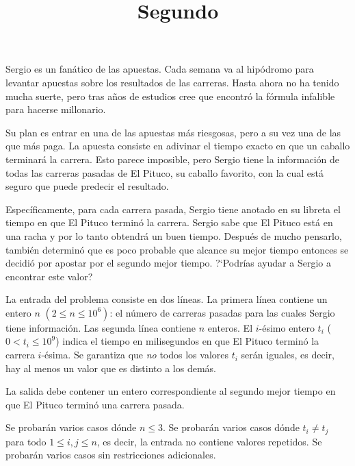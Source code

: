 \documentclass{oci}
\title{Segundo}
\newcommand{\caballo}{El Pituco\xspace}
\begin{document}
\begin{problemDescription}
Sergio es un fanático de las apuestas.
Cada semana va al hipódromo para levantar apuestas sobre los resultados de las carreras.
Hasta ahora no ha tenido mucha suerte, pero tras años de estudios cree que encontró la fórmula
infalible para hacerse millonario.

Su plan es entrar en una de las apuestas más riesgosas, pero a su vez una de las que más paga.
La apuesta consiste en adivinar el tiempo exacto en que un caballo terminará la carrera.
Esto parece imposible, pero Sergio tiene la información de todas las carreras pasadas de \caballo,
su caballo favorito, con la cual está seguro que puede predecir el resultado.

Específicamente, para cada carrera pasada, Sergio tiene anotado en su libreta el tiempo en que
\caballo terminó la carrera.
Sergio sabe que \caballo está en una racha y por lo tanto obtendrá un buen tiempo.
Después de mucho pensarlo, también determinó que es poco probable que alcance su mejor tiempo entonces
se decidió por apostar por el segundo mejor tiempo.
?`Podrías ayudar a Sergio a encontrar este valor?
\end{problemDescription}

\begin{inputDescription}
La entrada del problema consiste en dos líneas.
La primera línea contiene un entero $n$ $(2 \le n \le 10^6)$: el número de carreras pasadas para
las cuales Sergio tiene información.
Las segunda línea contiene $n$ enteros.
El $i$-ésimo entero $t_i$ ($0 < t_i \leq 10^9$) indica el tiempo en milisegundos en que \caballo
terminó la carrera $i$-ésima.
Se garantiza que \emph{no} todos los valores $t_i$ serán iguales, es decir, hay al menos un valor
que es distinto a los demás.
\end{inputDescription}

\begin{outputDescription}
La salida debe contener un entero correspondiente al segundo mejor tiempo en que \caballo
terminó una carrera pasada.
\end{outputDescription}

\begin{scoreDescription}
  Se probarán varios casos dónde $n \le 3$.
  Se probarán varios casos dónde $t_i\ne t_j$ para todo $1 \leq i, j \leq n$,
  es decir, la entrada no contiene valores repetidos.
  Se probarán varios casos sin restricciones adicionales.
\end{scoreDescription}

\begin{sampleDescription}
\end{sampleDescription}
\end{document}
